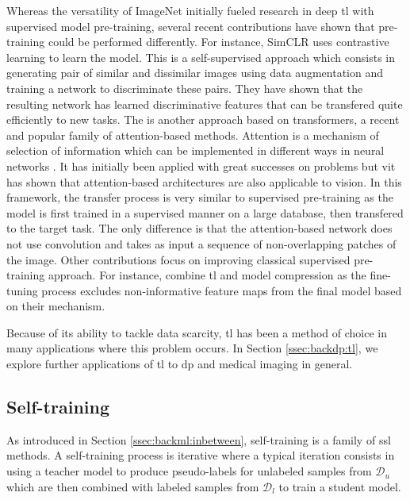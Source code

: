 Whereas the versatility of ImageNet initially fueled research in deep \acrlong{tl}
with supervised model pre-training, several recent contributions have shown that
pre-training could be performed differently. For instance, SimCLR \parencite{chen2020simple}
uses contrastive learning to learn the model. This is a self-supervised approach
which consists in generating pair of similar and dissimilar images using data
augmentation and training a network to discriminate these pairs. They have shown
that the resulting network has learned discriminative features that can be transfered
quite efficiently to new tasks. The  \parencite{dosovitskiy2020image}
is another approach based on transformers, a recent and popular family of
attention-based methods. Attention is a mechanism of selection of information
which can be implemented in different ways in neural networks \parencite{niu2021review}.
It has initially been applied with great successes on  problems
but \acrshort{vit} has shown that attention-based architectures are also applicable
to vision. In this framework, the transfer process is very similar to supervised
pre-training as the model is first trained in a supervised manner on a large
database, then transfered to the target task. The only difference is that the
attention-based network does not use convolution and takes as input a sequence of
non-overlapping patches of the image. Other contributions focus on improving
classical supervised pre-training approach. For instance, \parencite{wang2019pay}
combine \acrlong{tl} and model compression as the fine-tuning process excludes
non-informative feature maps from the final model based on their 
mechanism.

Because of its ability to tackle data scarcity, \acrlong{tl} has been a method of
choice in many applications where this problem occurs. In Section \ref{ssec:backdp:tl},
we explore further applications of \acrlong{tl} to \acrlong{dp} and medical imaging
in general.

\subsection{Self-training}
\label{ssec:backml:dl:selftraining}

As introduced in Section \ref{ssec:backml:inbetween}, self-training is a family of \acrlong{ssl} methods. A self-training process is iterative where a typical iteration consists in using a teacher model to produce pseudo-labels for unlabeled samples from $\mathcal{D}_u$ which are then combined with labeled samples from $\mathcal{D}_l$ to train a student model. 

